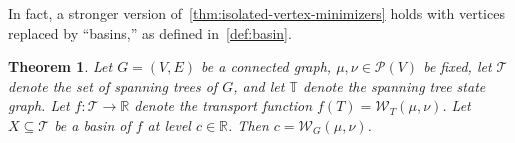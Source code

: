 \documentclass[11pt,a4paper]{article}
\newcommand{\prob}{{\mathscr{P}}}
\newcommand{\wass}{{\mathcal{W}}}
\newcommand{\setoftrees}{{\mathcal{T}}}
\newcommand{\stategraph}{{\mathbb{T}}}
\newcommand{\embedding}{{\mathsf{k}}}
\newcommand{\flowpoly}{{\mathcal{K}}}
\newtheorem{theorem}{Theorem}[section]
\begin{document}
 
In fact, a stronger version of~\cref{thm:isolated-vertex-minimizers} holds with vertices replaced by ``basins,'' as defined in~\cref{def:basin}. 

\begin{theorem}\label{thm:no-isolated-basins}
    Let $G=(V,E)$ be a connected graph, $\mu,\nu\in\prob(V)$ be fixed, let $\setoftrees$ denote the set of spanning trees of $G$, and let $\stategraph$ denote the spanning tree state graph. Let $f:\setoftrees\rightarrow\mathbb{R}$ denote the transport function $f(T) = \wass_T(\mu,\nu)$. Let $X\subseteq\setoftrees$ be a basin of $f$ at level $c\in\mathbb{R}$. Then $c = \wass_G(\mu,\nu)$.
\end{theorem}
\end{document}
